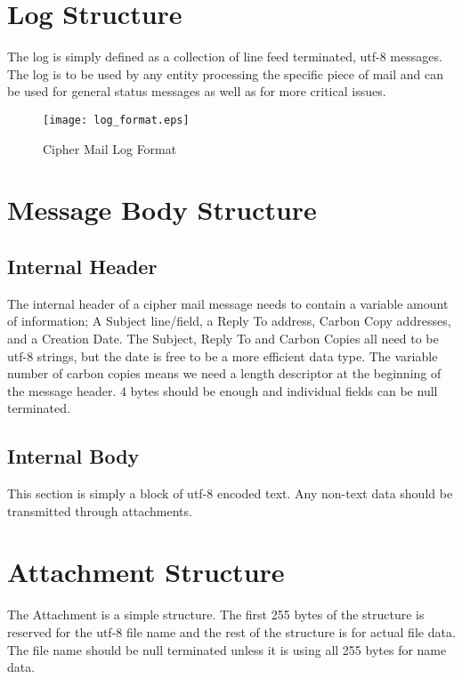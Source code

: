 \documentclass[a4paper,11pt]{IEEEtran}
\begin{document}
\section{Log Structure}
The log is simply defined as a collection of line feed terminated, utf-8 messages. The log is to be used by any entity processing the specific piece of mail and can be used for general status messages as well as for more critical issues.
\begin{figure}[H]
\centering
\texttt{[image: log\_format.eps]}
\caption{Cipher Mail Log Format}
\end{figure}

\section{Message Body Structure}
\subsection{Internal Header}
The internal header of a cipher mail message needs to contain a variable amount of information; A Subject line/field, a Reply To address, Carbon Copy addresses, and a Creation Date. The Subject, Reply To and Carbon Copies all need to be utf-8 strings, but the date is free to be a more efficient data type. The variable number of carbon copies means we need a length descriptor at the beginning of the message header. 4 bytes should be enough and individual fields can be null terminated.
\subsection{Internal Body}
This section is simply a block of utf-8 encoded text. Any non-text data should be transmitted through attachments.

\section{Attachment Structure}
The Attachment is a simple structure. The first 255 bytes of the structure is reserved for the utf-8 file name and the rest of the structure is for actual file data. The file name should be null terminated unless it is using all 255 bytes for name data.
\end{document}
